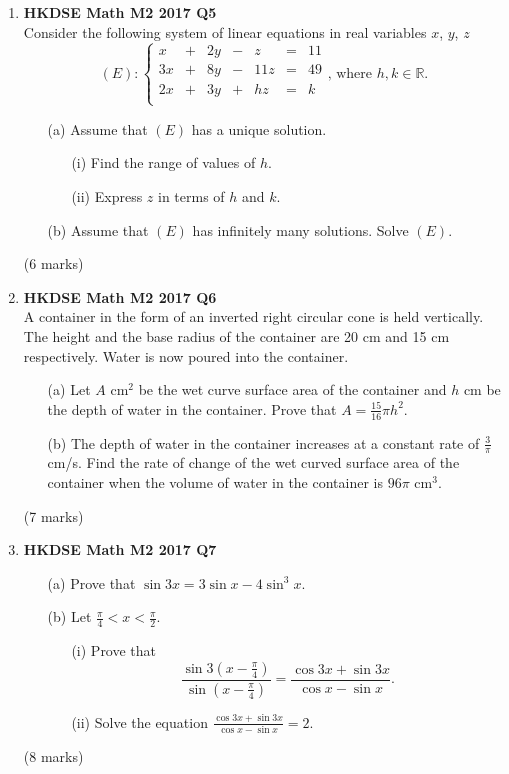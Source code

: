 \documentclass{report}
\begin{document}
\begin{enumerate}
	\item \textbf{HKDSE Math M2 2017 Q5}\\
	Consider the following system of linear equations in real variables $x$, $y$, $z$
		$$(E) : \left\{\begin{matrix}
		x&  +&2y&  -&z& = &11  \\
		3x& +&8y&  -&11z& = & 49 \\
		2x& +&3y&  +&hz& = & k \\
		\end{matrix}\right.\text{, where } h,k \in \mathbb{R}.$$ 
	\begin{enumerate}
		\item [(a)] Assume that $(E)$ has a unique solution.
		\begin{enumerate}
			\item [(i)]Find the range of values of $h$.
			\item [(ii)]Express $z$ in terms of $h$ and $k$.
		\end{enumerate}
		\item [(b)]Assume that $(E)$ has infinitely many solutions. Solve $(E)$.
	\end{enumerate}
	(6 marks)

	\newpage

	\item \textbf{HKDSE Math M2 2017 Q6}\\
	A container in the form of an inverted right circular cone is held vertically. The height and the base radius of the container are 20 cm and 15 cm respectively. Water is now poured into the container.
	\begin{enumerate}
		\item [(a)]Let $A$ cm$^2$ be the wet curve surface area of the container and $h$ cm be the depth of water in the container. Prove that $\displaystyle A = \frac{15}{16}\pi h^2$. 
		\item [(b)]The depth of water in the container increases at a constant rate of $\displaystyle\frac{3}{\pi}$ cm/s. Find the rate of change of the wet curved surface area of the container when the volume of water in the container is $96 \pi$ cm$^3$.
	\end{enumerate}
	(7 marks)

	\item\textbf{HKDSE Math M2 2017 Q7}
	\begin{enumerate}
		\item[(a)]Prove that $\sin{3x} = 3\sin{x}  - 4\sin^3{x}$. 
		\item[(b)]Let $\displaystyle\frac{\pi}{4} < x < \frac{\pi}{2}$.
		\begin{enumerate}
			\item [(i)]Prove that $$\displaystyle\frac{\sin{3\left(x - \displaystyle\frac{\pi}{4}\right)}}{\sin{\left(x - \displaystyle\frac{\pi}{4}\right)}} = \frac{\cos{3x} + \sin{3x}}{\cos{x} - \sin{x}}.$$
			\item [(ii)]Solve the equation $\displaystyle\frac{\cos{3x} + \sin{3x}}{\cos{x} - \sin{x}} = 2$.
		\end{enumerate}
	\end{enumerate}
	(8 marks)


\end{enumerate}
\end{document}
